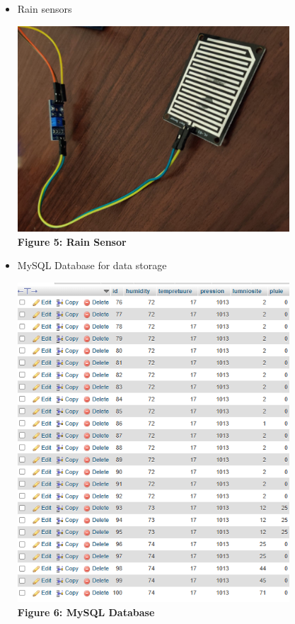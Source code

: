 \documentclass[a4paper,12pt]{article}
\begin{document}
\begin{itemize}
		\item Rain sensors
		\begin{center}
			\includegraphics[width=0.8\textwidth]{rain.png}\\
			\textbf{Figure 5: Rain Sensor}
		\end{center}
		
		\item MySQL Database for data storage
		\begin{center}
			\includegraphics[width=0.8\textwidth]{database.png}\\
			\textbf{Figure 6: MySQL Database}
		\end{center}
	\end{itemize}
	
\end{document}
